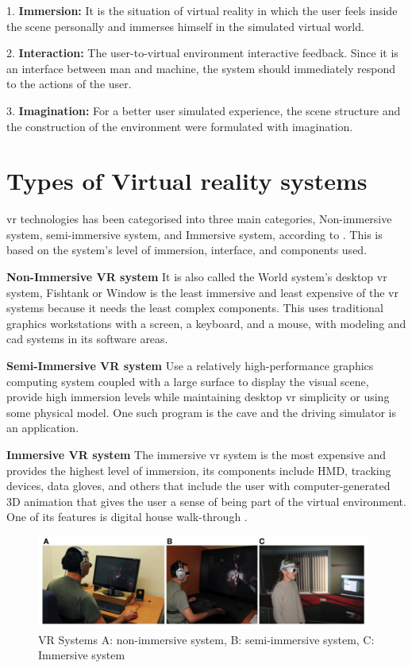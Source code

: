 1. \textbf{Immersion:} It is the situation of virtual reality in which the user feels inside the scene personally and immerses himself in the simulated virtual world.



2. \textbf{Interaction:} The user-to-virtual environment interactive feedback. Since it is an interface between man and machine, the system should immediately respond to the actions of the user.




3. \textbf{Imagination:} For a better user simulated experience, the scene structure and the construction of the environment were formulated with imagination.

\section{Types of Virtual reality systems} \acrshort{vr} technologies has been categorised into three main categories, Non-immersive system, semi-immersive system, and Immersive system, according to \cite{Bamodu2013VirtualComponents}. This is based on the system's level of immersion, interface, and components used.  

\textbf{Non-Immersive VR system}
It is also called the World system's desktop \acrshort{vr} system, Fishtank or Window is the least immersive and least expensive of the \acrshort{vr} systems because it needs the least complex components. This uses traditional graphics workstations with a screen, a keyboard, and a mouse, with modeling and \acrfull{cad} systems in its software areas.  

\textbf{Semi-Immersive VR system}
Use a relatively high-performance graphics computing system coupled with a large surface to display the visual scene, provide high immersion levels while maintaining desktop \acrshort{vr} simplicity or using some physical model. One such program is the \acrfull{cave} and the driving simulator is an application. 

\textbf{Immersive VR system}
 The immersive \acrshort{vr} system is the most expensive and provides the highest level of immersion, its components include HMD, tracking devices, data gloves, and others that include the user with computer-generated 3D animation that gives the user a sense of being part of the virtual environment. One of its features is digital house walk-through \citep{Bamodu2013VirtualComponents, Baus2014MovingReview}.

\begin{figure}[ht]
    \centering
    \includegraphics[width=0.98\textwidth]{images/vrsystem.png}
    \caption{VR Systems A: non-immersive system, B: semi-immersive system, C: Immersive system \citep{Baus2014MovingReview}}
    \label{fig:vrsys}
\end{figure}


